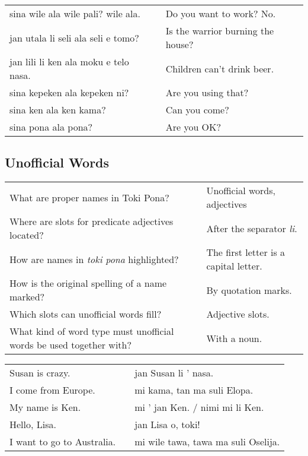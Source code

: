 \begin{supertabular}{p{5,5cm}|ll}
    sina wile ala wile pali? wile ala.    &  & Do you want to work? No.          \\
    jan utala li seli ala seli e tomo?    &  & Is the warrior burning the house? \\
    jan lili li ken ala moku e telo nasa. &  & Children can't drink beer.        \\
    sina kepeken ala kepeken ni?          &  & Are you using that?               \\
    sina ken ala ken kama?                &  & Can you come?                     \\
    sina pona ala pona?                   &  & Are you OK?                       \\
\end{supertabular}

\newpage

\subsection*{Unofficial Words}
\label{'unofficial_words_answers'}

\begin{supertabular}{p{5,5cm}|ll}
    What are proper names in Toki Pona?                                 &  & Unofficial words, adjectives          \\
    Where are slots for predicate adjectives located?                   &  & After the separator \textit{li}.      \\
    How are names in \textit{toki pona} highlighted?                    &  & The first letter is a capital letter. \\
    How is the original spelling of a name marked?                      &  & By quotation marks.                   \\
    Which slots can unofficial words fill?                              &  & Adjective slots.                      \\
    What kind of word type must unofficial words be used together with? &  & With a noun.                          \\
\end{supertabular}

\begin{supertabular}{p{5,5cm}|ll}
    Susan is crazy.            &  & jan Susan li ' nasa.                \\
    I come from Europe.        &  & mi kama, tan ma suli Elopa.         \\
    My name is Ken.            &  & mi ' jan Ken. / nimi mi li Ken.     \\
    Hello, Lisa.               &  & jan Lisa o, toki!                   \\
    I want to go to Australia. &  & mi wile tawa, tawa ma suli Oselija. \\
\end{supertabular}


